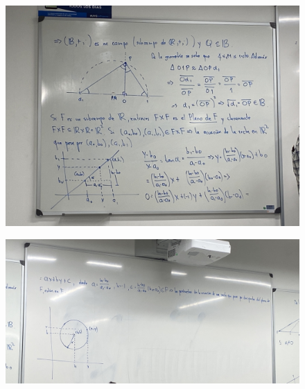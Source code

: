 \begin{figure}[H]
    \centering
    \includegraphics[scale=0.2]{imagenes/27.3.jpeg}
\end{figure}

\begin{figure}[H]
    \centering
    \includegraphics[scale=0.2]{imagenes/27.4.jpeg}
\end{figure}